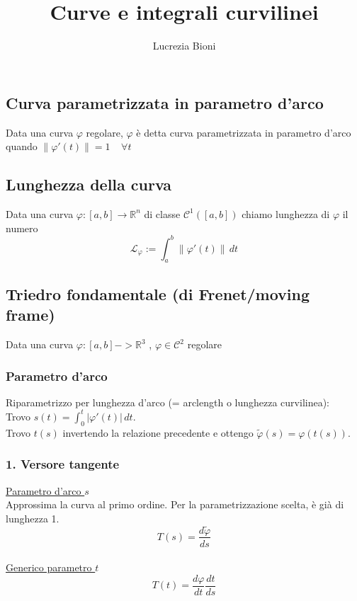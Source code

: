 \documentclass{article} %
\title{Curve e integrali curvilinei} %
\author{Lucrezia Bioni} %
\date{} %
\begin{document}
    \maketitle

    \subsection*{Curva parametrizzata in parametro d'arco}
    Data una curva $\varphi$ regolare, $\varphi$ è detta curva parametrizzata in parametro d'arco
    quando $ \| \varphi  '(t) \| = 1 \ \ \ \ \ \forall t $

    \subsection*{Lunghezza della curva}
    Data una curva $\varphi:[a,b]\to \mathbb{R} ^n $ di classe $ \mathcal{C} ^1([a,b]) $ chiamo 
    lunghezza di $\varphi$ il numero 
    $$ \mathcal{L} _\varphi := \int_{a}^{b} \| \varphi  '(t) \| \, dt  $$

    \subsection*{Triedro fondamentale (di Frenet/moving frame)}
    Data una curva $\varphi:[a,b]->\mathbb{R} ^3$ , $\varphi \in \mathcal{C} ^2 $ regolare

    \subsubsection*{Parametro d'arco}
    Riparametrizzo per lunghezza d'arco (= arclength o lunghezza curvilinea): \\ Trovo $s(t) = \int_{0}^{t} \left| \varphi'(t) \right| \,dt $. \\ Trovo $t(s)$ invertendo la relazione precedente e ottengo $\tilde{\varphi}(s) = \varphi( t(s) )$.
    
    \subsubsection*{ 1. Versore tangente}
    \underline{Parametro d'arco $s$} \\ Approssima la curva al primo ordine. Per la parametrizzazione scelta, è già di lunghezza 1. $$T(s)=\frac{d\tilde{\varphi}}{ds} $$ \\ \underline{Generico parametro $t$} $$T(t) = \frac{d\varphi}{dt} \frac{dt}{ds}$$
\end{document}
